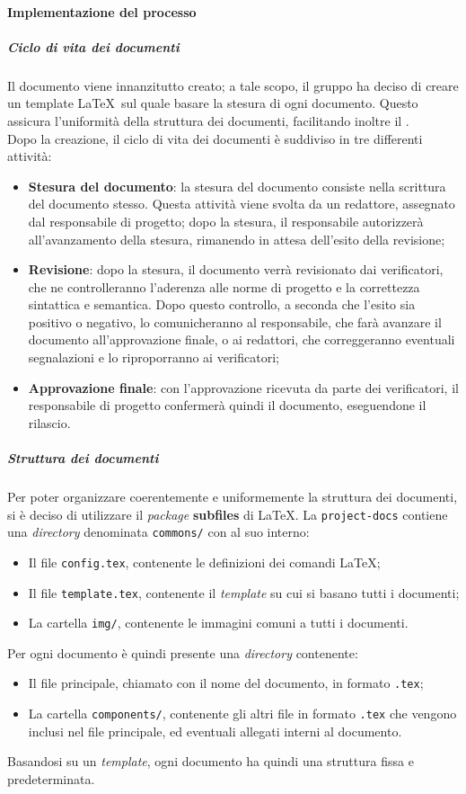 \documentclass[../norme-di-progetto.tex]{subfiles}
\begin{document}
\paragraph{Implementazione del processo}
\subparagraph{Ciclo di vita dei documenti}
Il documento viene innanzitutto creato; a tale scopo, il gruppo ha deciso di creare un template \LaTeX\ sul quale basare la stesura di ogni documento. Questo assicura l'uniformità della struttura dei documenti, facilitando inoltre il . \\
Dopo la creazione, il ciclo di vita dei documenti è suddiviso in tre differenti attività:
\begin{itemize}
  \item \textbf{Stesura del documento}: la stesura del documento consiste nella scrittura del documento stesso. Questa attività viene svolta da un redattore, assegnato dal responsabile di progetto; dopo la stesura, il responsabile autorizzerà all'avanzamento della stesura, rimanendo in attesa dell'esito della revisione;
  \item \textbf{Revisione}: dopo la stesura, il documento verrà revisionato dai verificatori, che ne controlleranno l'aderenza alle norme di progetto e la correttezza sintattica e semantica. Dopo questo controllo, a seconda che l'esito sia positivo o negativo, lo comunicheranno al responsabile, che farà avanzare il documento all'approvazione finale, o ai redattori, che correggeranno eventuali segnalazioni e lo riproporranno ai verificatori;
  \item \textbf{Approvazione finale}: con l'approvazione ricevuta da parte dei verificatori, il responsabile di progetto confermerà quindi il documento, eseguendone il rilascio.
\end{itemize}

\subparagraph{Struttura dei documenti}
Per poter organizzare coerentemente e uniformemente la struttura dei documenti, si è deciso di utilizzare il \textit{package} \textbf{subfiles} di \LaTeX. La  \texttt{project-docs} contiene una \textit{directory} denominata \texttt{commons/} con al suo interno:
\begin{itemize}
  \item Il file \texttt{config.tex}, contenente le definizioni dei comandi \LaTeX;
  \item Il file \texttt{template.tex}, contenente il \textit{template} su cui si basano tutti i documenti;
  \item La cartella \texttt{img/}, contenente le immagini comuni a tutti i documenti.
\end{itemize}
Per ogni documento è quindi presente una \textit{directory} contenente:
\begin{itemize}
  \item  Il file principale, chiamato con il nome del documento, in formato \texttt{.tex};
  \item La cartella \texttt{components/}, contenente gli altri file in formato \texttt{.tex} che vengono inclusi nel file principale, ed eventuali allegati interni al documento.
\end{itemize}
Basandosi su un \textit{template}, ogni documento ha quindi una struttura fissa e predeterminata.
\end{document}
